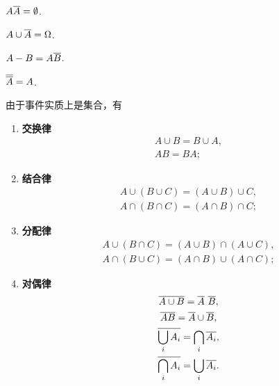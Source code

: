 \begin{property}
\(A \SetComplementaryL{A} = \emptyset\).
\end{property}

\begin{property}
\(A \cup \SetComplementaryL{A} = \Omega\).
\end{property}

\begin{property}
\(A - B = A \SetComplementaryL{B}\).
\end{property}

\begin{property}
\(\SetComplementaryL{\SetComplementaryL{A}} = A\).
\end{property}

\begin{theorem}[事件的运算规律]
由于事件实质上是集合，有
\begin{enumerate}
	\item {\rm\bf 交换律}
	\begin{gather}
		A \cup B = B \cup A, \\
		A B = B A;
	\end{gather}

	\item {\rm\bf 结合律}
	\begin{gather}
		A \cup (B \cup C) = (A \cup B) \cup C, \\
		A \cap (B \cap C) = (A \cap B) \cap C;
	\end{gather}

	\item {\rm\bf 分配律}
	\begin{gather}
		A \cup (B \cap C) = (A \cup B) \cap (A \cup C), \\
		A \cap (B \cup C) = (A \cap B) \cup (A \cap C);
	\end{gather}

	\item {\rm\bf 对偶律}
	\begin{gather}
		\SetComplementaryL{A \cup B} = \SetComplementaryL{A}\ \SetComplementaryL{B}, \\
		\SetComplementaryL{AB} = \SetComplementaryL{A} \cup \SetComplementaryL{B}, \\
		\SetComplementaryL{\bigcup_i A_i} = \bigcap_i \SetComplementaryL{A_i}, \\
		\SetComplementaryL{\bigcap_i A_i} = \bigcup_i \SetComplementaryL{A_i}.
	\end{gather}
\end{enumerate}
\end{theorem}
